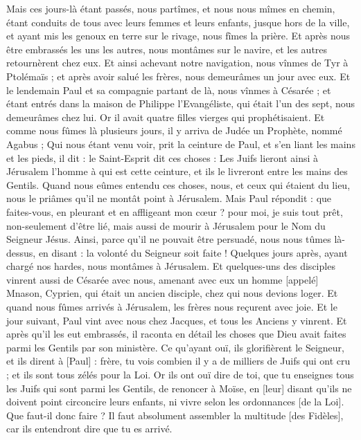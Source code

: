 \begin{multicols}{2}
Mais ces jours-là étant passés, nous partîmes, et nous nous mîmes en chemin, étant conduits de tous avec leurs femmes et leurs enfants, jusque hors de la ville, et ayant mis les genoux en terre sur le rivage, nous fîmes la prière.
Et après nous être embrassés les uns les autres, nous montâmes sur le navire, et les autres retournèrent chez eux.
Et ainsi achevant notre navigation, nous vînmes de Tyr à Ptolémaïs ; et après avoir salué les frères, nous demeurâmes un jour avec eux.
Et le lendemain Paul et sa compagnie partant de là, nous vînmes à Césarée ; et étant entrés dans la maison de Philippe l'Evangéliste, qui était l'un des sept, nous demeurâmes chez lui.
Or il avait quatre filles vierges qui prophétisaient.
Et comme nous fûmes là plusieurs jours, il y arriva de Judée un Prophète, nommé Agabus ;
Qui nous étant venu voir, prit la ceinture de Paul, et s'en liant les mains et les pieds, il dit : le Saint-Esprit dit ces choses : Les Juifs lieront ainsi à Jérusalem l'homme à qui est cette ceinture, et ils le livreront entre les mains des Gentils.
Quand nous eûmes entendu ces choses, nous, et ceux qui étaient du lieu, nous le priâmes qu'il ne montât point à Jérusalem.
Mais Paul répondit : que faites-vous, en pleurant et en affligeant mon cœur ? pour moi, je suis tout prêt, non-seulement d'être lié, mais aussi de mourir à Jérusalem pour le Nom du Seigneur Jésus.
Ainsi, parce qu'il ne pouvait être persuadé, nous nous tûmes là-dessus, en disant : la volonté du Seigneur soit faite !
Quelques jours après, ayant chargé nos hardes, nous montâmes à Jérusalem.
Et quelques-uns des disciples vinrent aussi de Césarée avec nous, amenant avec eux un homme [appelé] Mnason, Cyprien, qui était un ancien disciple, chez qui nous devions loger.
Et quand nous fûmes arrivés à Jérusalem, les frères nous reçurent avec joie.
Et le jour suivant, Paul vint avec nous chez Jacques, et tous les Anciens y vinrent.
Et après qu'il les eut embrassés, il raconta en détail les choses que Dieu avait faites parmi les Gentils par son ministère.
Ce qu'ayant ouï, ils glorifièrent le Seigneur, et ils dirent à [Paul] : frère, tu vois combien il y a de milliers de Juifs qui ont cru ; et ils sont tous zélés pour la Loi.
Or ils ont ouï dire de toi, que tu enseignes tous les Juifs qui sont parmi les Gentils, de renoncer à Moïse, en [leur] disant qu'ils ne doivent point circoncire leurs enfants, ni vivre selon les ordonnances [de la Loi].
Que faut-il donc faire ? Il faut absolument assembler la multitude [des Fidèles], car ils entendront dire que tu es arrivé.

\end{multicols}
